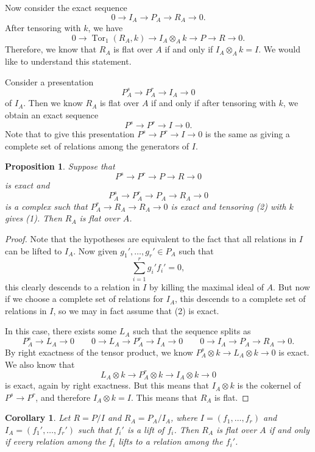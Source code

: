 \documentclass[leqno, openany]{memoir}
\newtheorem{cor}[thm]{Corollary}
\newtheorem{prop}[thm]{Proposition}
\theoremstyle{definition}
\theoremstyle{remark}
\theoremstyle{plain}
\theoremstyle{definition}
\theoremstyle{remark}
\DeclareMathOperator{\Tor}{Tor}
\begin{document}
Now consider the exact sequence
\[ 0 \to I_A \to P_A \to R_A \to 0. \]
After tensoring with $k$, we have 
\[ 0 \to \Tor_1(R_A, k) \to I_A \otimes_A k \to P \to R \to 0. \]
Therefore, we know that $R_A$ is flat over $A$ if and only if $I_A \otimes_A k = I$. We would like to understand this statement.

Consider a presentation
\[ P^s_A \to P_A^r \to I_A \to 0 \]
of $I_A$. Then we know $R_A$ is flat over $A$ if and only if after tensoring with $k$, we obtain an exact sequence
\[ P^s \to P^r \to I \to 0. \]
Note that to give this presentation $P^s \to P^r \to I \to 0$ is the same as giving a complete set of relations among the generators of $I$.

\begin{prop}
    Suppose that 
    \begin{equation} P^s \to P^r \to P \to R \to 0 \end{equation}
    is exact and
    \begin{equation} P_A^s \to P_A^r \to P_A \to R_A \to 0 \end{equation}
    is a complex such that $P_A^r \to R_A \to R_A \to 0$ is exact and tensoring (2) with $k$ gives (1). Then $R_A$ is flat over $A$.
\end{prop}

\begin{proof}
    Note that the hypotheses are equivalent to the fact that all relations in $I$ can be lifted to $I_A$. Now given $g_1', \ldots, g_r' \in P_A$ such that 
    \[ \sum_{i=1}^r g_i' f_i' = 0, \]
    this clearly descends to a relation in $I$ by killing the maximal ideal of $A$. But now if we choose a complete set of relations for $I_A$, this descends to a complete set of relations in $I$, so we may in fact assume that (2) is exact.

    In this case, there exists some $L_A$ such that the sequence splits as
    \[ P_A^s \to L_A \to 0 \qquad 0 \to L_A \to P_A^r \to I_A \to 0 \qquad 0 \to I_A \to P_A \to R_A \to 0. \]
    By right exactness of the tensor product, we know $P_A^{s} \otimes k \to L_A \otimes k \to 0$ is exact. We also know that
    \[ L_A \otimes k \to P_A^r \otimes k \to I_A \otimes k \to 0 \]
    is exact, again by right exactness. But this means that $I_A \otimes k$ is the cokernel of $P^s \to P^r$, and therefore $I_A \otimes k = I$. This means that $R_A$ is flat.
\end{proof}

\begin{cor}
    Let $R = P/I$ and $R_A = P_A / I_A$, where $I = (f_1, \ldots, f_r)$ and $I_A = (f_1', \ldots, f_r')$ such that $f_i'$ is a lift of $f_i$. Then $R_A$ is flat over $A$ if and only if every relation among the $f_i$ lifts to a relation among the $f_i'$.
\end{cor}
\end{document}
